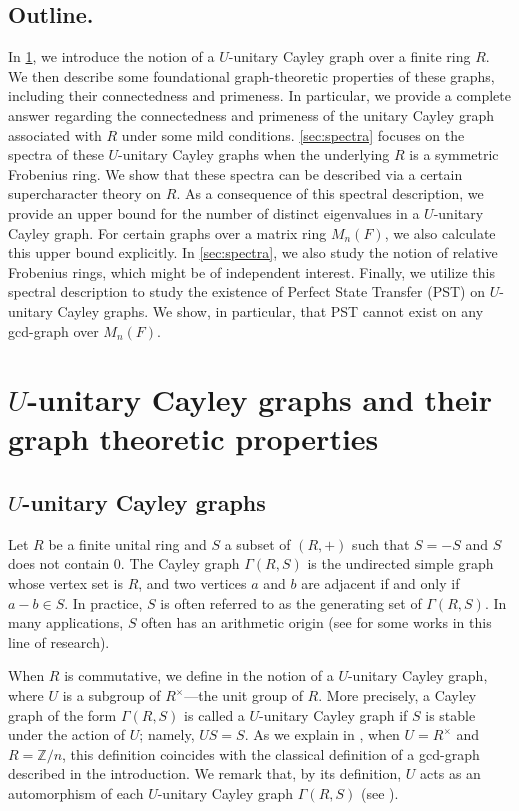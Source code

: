 \documentclass[12pt, a4paper]{amsart}
\theoremstyle{definition}
\numberwithin{equation}{section}
\begin{document}
\subsection{Outline.} 
In \cref{sec:foundation}, we introduce the notion of a $U$-unitary Cayley graph over a finite ring $R$. We then describe some foundational graph-theoretic properties of these graphs, including their connectedness and primeness. In particular, we provide a complete answer regarding the connectedness and primeness of the unitary Cayley graph associated with $R$ under some mild conditions. \cref{sec:spectra} focuses on the spectra of these $U$-unitary Cayley graphs when the underlying $R$ is a symmetric Frobenius ring. We show that these spectra can be described via a certain supercharacter theory on $R$. As a consequence of this spectral description, we provide an upper bound for the number of distinct eigenvalues in a $U$-unitary Cayley graph. For certain graphs over a matrix ring $M_n(F)$, we also calculate this upper bound explicitly. In \cref{sec:spectra}, we also study the notion of relative Frobenius rings, which might be of independent interest. Finally, we utilize this spectral description to study the existence of Perfect State Transfer (PST) on $U$-unitary Cayley graphs. We show, in particular, that PST cannot exist on any gcd-graph over $M_n(F)$.


\section{$U$-unitary Cayley graphs and their graph theoretic properties} 
\label{sec:foundation}
\subsection{$U$-unitary Cayley graphs}
Let $R$ be a finite unital ring and $S$ a subset of $(R,+)$ such that $S = -S$ and $S$ does not contain $0$. The Cayley graph $\Gamma(R,S)$ is the undirected simple graph whose vertex set is $R$, and two vertices $a$ and $b$ are adjacent if and only if $a - b \in S$. In practice, $S$ is often referred to as the generating set of $\Gamma(R,S)$. In many applications, $S$ often has an arithmetic origin (see \cite{unitary, huang2022quadratic, jones2020isomorphisms, keshavarzi2025involutory, minac2023paley, podesta2019spectral, podesta2021_finitefield, suntornpoch2016cayley} for some works in this line of research).



When $R$ is commutative, we define in \cite{nguyen2025supercharacters} the notion of a $U$-unitary Cayley graph, where $U$ is a subgroup of $R^{\times}$—the unit group of $R$. More precisely, a Cayley graph of the form $\Gamma(R,S)$ is called a $U$-unitary Cayley graph if $S$ is stable under the action of $U$; namely, $US = S$. As we explain in \cite{nguyen2025supercharacters}, when $U = R^{\times}$ and $R = \mathbb{Z}/n$, this definition coincides with the classical definition of a gcd-graph described in the introduction. We remark that, by its definition, $U$ acts as an automorphism of each $U$-unitary Cayley graph $\Gamma(R,S)$ (see \cite[Proposition 3.7]{nguyen2025supercharacters}).
\end{document}
